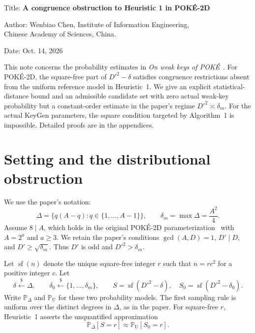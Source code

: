 \documentclass[a4paper,11pt]{article}
\theoremstyle{remark}
\DeclareMathOperator{\sfpart}{sf}
\newcommand{\PrD}{\mathbb P_{\Delta}}
\newcommand{\PrU}{\mathbb P_{\mathrm U}}
\begin{document}
\noindent Title: \textbf{A congruence obstruction to Heuristic 1 in POK\'E-2D}
\par\vspace{1em}
\noindent
\begin{minipage}[t]{0.76\textwidth}
Author: Wenbiao Chen, Institute of Information Engineering,\\
Chinese Academy of Sciences, China.
\end{minipage}\hfill
\begin{minipage}[t]{0.23\textwidth}
\raggedleft Date: Oct. 14, 2026
\end{minipage}
\par\vspace{1.4em}

This note concerns the probability estimates in \emph{On weak keys of
POK\'E}~\cite{Moriya2026}. For POK\'E-2D, the square-free part of
$D'^2-\delta$ satisfies congruence restrictions absent from the uniform
reference model in Heuristic~1. We give an explicit statistical-distance
bound and an admissible candidate set with zero actual weak-key probability
but a constant-order estimate in the paper's regime $D'^2\asymp\delta_m$.
For the actual KeyGen parameters, the square condition targeted by
Algorithm~1 is impossible. Detailed proofs are in the appendices.

\section{Setting and the distributional obstruction}

We use the paper's notation:
\[
 \Delta=\{q(A-q):q\in\{1,\ldots,A-1\}\},
 \qquad \delta_m=\max\Delta=\frac{A^2}{4}.
\]
Assume $8\mid A$, which holds in the original POK\'E-2D
parameterization~\cite{BassoMaino2025} with $A=2^a$ and $a\ge3$.
We retain the paper's conditions
$\gcd(A,D)=1$, $D'\mid D$, and $D'\ge\sqrt{\delta_m}$.
Thus $D'$ is odd and $D'^2>\delta_m$.

Let $\sfpart(n)$ denote the unique square-free integer $r$ such that
$n=rc^2$ for a positive integer $c$. Let
\[
 \delta\overset{\$}{\leftarrow}\Delta,
 \qquad
 \delta_0\overset{\$}{\leftarrow}\{1,\ldots,\delta_m\},
 \qquad
 S=\sfpart(D'^2-\delta),\quad S_0=\sfpart(D'^2-\delta_0).
\]
Write $\PrD$ and $\PrU$ for these two probability models.
The first sampling rule is uniform over the distinct degrees in $\Delta$,
as in the paper. For square-free $r$, Heuristic~1 asserts the unquantified approximation
\begin{equation}\label{eq:H1}
 \PrD[S=r]\approx\PrU[S_0=r].
\end{equation}
\end{document}
